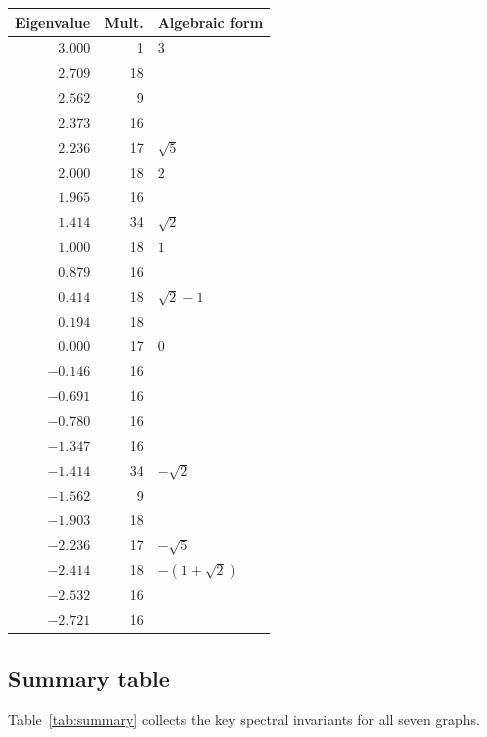 \documentclass[11pt,a4paper]{amsart}
\theoremstyle{definition}
\theoremstyle{remark}
\begin{document}
\begin{table}[ht]
\begin{center}
\begin{tabular}{rrl}
\toprule
Eigenvalue & Mult. & Algebraic form \\
\midrule
$3.000$ & 1 & $3$ \\
$2.709$ & 18 & \\
$2.562$ & 9 & \\
$2.373$ & 16 & \\
$2.236$ & 17 & $\sqrt{5}$ \\
$2.000$ & 18 & $2$ \\
$1.965$ & 16 & \\
$1.414$ & 34 & $\sqrt{2}$ \\
$1.000$ & 18 & $1$ \\
$0.879$ & 16 & \\
$0.414$ & 18 & $\sqrt{2}-1$ \\
$0.194$ & 18 & \\
$0.000$ & 17 & $0$ \\
$-0.146$ & 16 & \\
$-0.691$ & 16 & \\
$-0.780$ & 16 & \\
$-1.347$ & 16 & \\
$-1.414$ & 34 & $-\sqrt{2}$ \\
$-1.562$ & 9 & \\
$-1.903$ & 18 & \\
$-2.236$ & 17 & $-\sqrt{5}$ \\
$-2.414$ & 18 & $-(1+\sqrt{2})$ \\
$-2.532$ & 16 & \\
$-2.721$ & 16 & \\
\bottomrule
\end{tabular}

\end{center}
\end{table}

\clearpage

\subsection{Summary table}

Table~\ref{tab:summary} collects the key spectral invariants for all seven graphs.
\end{document}
